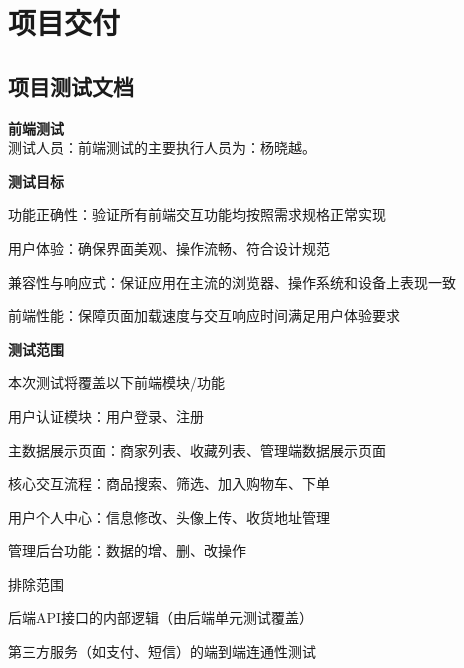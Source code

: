 \chapter{项目交付}


\section{项目测试文档}

\begin{levellist}
    \item \textbf{前端测试} \\
    测试人员：前端测试的主要执行人员为：杨晓越。

    \begin{levellist}
        \item \textbf{测试目标}
        \begin{levellist}
            \item 功能正确性：验证所有前端交互功能均按照需求规格正常实现
            \item 用户体验：确保界面美观、操作流畅、符合设计规范
            \item 兼容性与响应式：保证应用在主流的浏览器、操作系统和设备上表现一致
            \item 前端性能：保障页面加载速度与交互响应时间满足用户体验要求
        \end{levellist}

        \item \textbf{测试范围}
        \begin{levellist}
            \item 本次测试将覆盖以下前端模块/功能
            \begin{levellist}
                \item 用户认证模块：用户登录、注册
                \item 主数据展示页面：商家列表、收藏列表、管理端数据展示页面
                \item 核心交互流程：商品搜索、筛选、加入购物车、下单
                \item 用户个人中心：信息修改、头像上传、收货地址管理
                \item 管理后台功能：数据的增、删、改操作
            \end{levellist}
            \item 排除范围
            \item 后端API接口的内部逻辑（由后端单元测试覆盖）
            \item 第三方服务（如支付、短信）的端到端连通性测试
        \end{levellist}


\end{levellist}
\end{levellist}
